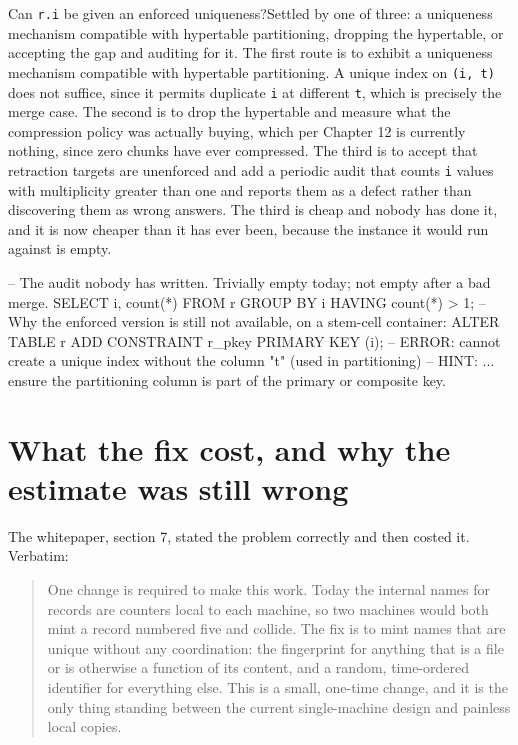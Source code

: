 \begin{Open}{Can \texttt{r.i} be given an enforced uniqueness?}{Settled by one of three: a uniqueness mechanism compatible with hypertable partitioning, dropping the hypertable, or accepting the gap and auditing for it.}
The first route is to exhibit a uniqueness mechanism compatible with hypertable partitioning. A unique index on \texttt{(i, t)} does not suffice, since it permits duplicate \texttt{i} at different \texttt{t}, which is precisely the merge case. The second is to drop the hypertable and measure what the compression policy was actually buying, which per Chapter 12 is currently nothing, since zero chunks have ever compressed. The third is to accept that retraction targets are unenforced and add a periodic audit that counts \texttt{i} values with multiplicity greater than one and reports them as a defect rather than discovering them as wrong answers. The third is cheap and nobody has done it, and it is now cheaper than it has ever been, because the instance it would run against is empty.
\begin{Check}
-- The audit nobody has written. Trivially empty today; not empty after a bad merge.
SELECT i, count(*) FROM r GROUP BY i HAVING count(*) > 1;
-- Why the enforced version is still not available, on a stem-cell container:
ALTER TABLE r ADD CONSTRAINT r_pkey PRIMARY KEY (i);
-- ERROR: cannot create a unique index without the column "t" (used in partitioning)
-- HINT: ... ensure the partitioning column is part of the primary or composite key.
\end{Check}
\end{Open}

\section{What the fix cost, and why the estimate was still wrong}

The whitepaper, section 7, stated the problem correctly and then costed it. Verbatim:

\begin{quote}
One change is required to make this work. Today the internal names for records are counters local to each machine, so two machines would both mint a record numbered five and collide. The fix is to mint names that are unique without any coordination: the fingerprint for anything that is a file or is otherwise a function of its content, and a random, time-ordered identifier for everything else. This is a small, one-time change, and it is the only thing standing between the current single-machine design and painless local copies.
\end{quote}

